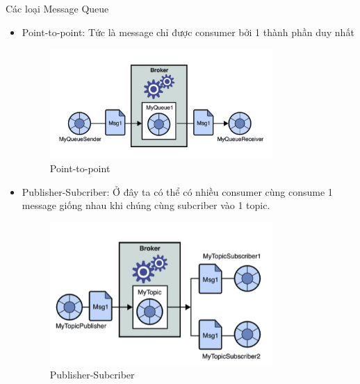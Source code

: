\begin{itemize}
            Các loại Message Queue
            
            \begin{itemize}
                \item Point-to-point: Tức là message chỉ được consumer bởi 1 thành phần duy nhất
                
                \newpage
                
                \begin{figure}[!ht]   			\includegraphics[width=0.8\textwidth]{Images/PTP.png}
        		\centering
        		\linebreak
        		\caption{Point-to-point}
                \end{figure}
                
                \item Publisher-Subcriber: Ở đây ta có thể có nhiều consumer cùng consume 1 message giống nhau khi chúng cùng subcriber vào 1 topic.
                
                \begin{figure}[!ht]   			\includegraphics[width=0.8\textwidth]{Images/PS.png}
        		\centering
        		\linebreak
        		\caption{Publisher-Subcriber}
                \end{figure}
                

\end{itemize}
\end{itemize}
